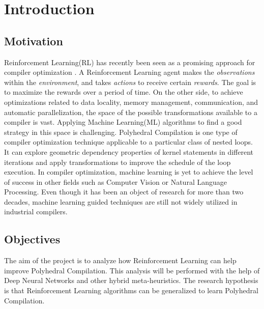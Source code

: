 \documentclass[logo,msc]{infthesis}           %
\begin{document}
\chapter{Introduction}

\section{Motivation}

Reinforcement Learning(RL) has recently been seen as a promising approach for compiler optimization \cite{8357388}\cite{9232934}. A Reinforcement Learning agent makes the \textit{observations} within the \textit{environment}, and takes \textit{actions} to receive certain \textit{rewards}. The goal is to maximize the rewards over a period of time. On the other side, to achieve optimizations related to data locality, memory management, communication, and automatic parallelization, the space of the possible transformations available to a compiler is vast. Applying Machine Learning(ML) algorithms to find a good strategy in this space is challenging. Polyhedral Compilation is one type of compiler optimization technique applicable to a particular class of nested loops. It can explore geometric dependency properties of kernel statements in different iterations and apply transformations to improve the schedule of the loop execution. In compiler optimization, machine learning is yet to achieve the level of success in other fields such as Computer Vision or Natural Language Processing. Even though it has been an object of research for more than two decades, machine learning guided techniques are still not widely utilized in industrial compilers.



\section{Objectives}

The aim of the project is to analyze how Reinforcement Learning can help improve Polyhedral Compilation. This analysis will be performed with the help of Deep Neural Networks and other hybrid meta-heuristics. The research hypothesis is that Reinforcement Learning algorithms can be generalized to learn Polyhedral Compilation.
\end{document}
